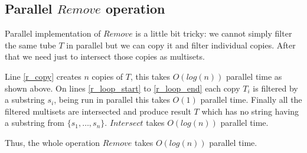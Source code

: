 \subsection{Parallel $Remove$ operation}

Parallel implementation of $Remove$ is a little bit tricky: we cannot simply filter the same tube $T$ in parallel but we can copy it and filter individual copies. After that we need just to intersect those copies as multisets.


Line \ref{r_copy} creates $n$ copies of $T$, this takes $O(log(n))$ parallel time as shown above. On lines \ref{r_loop_start} to \ref{r_loop_end} each copy $T_i$ is filtered by a substring $s_i$, being run in parallel this takes $O(1)$ parallel time. Finally all the filtered multisets are intersected and produce result $T$ which has no string having a substring from $\{s_1, \dots, s_n\}$. $Intersect$ takes $O(log(n))$ parallel time.

Thus, the whole operation $Remove$ takes $O(log(n))$ parallel time.

